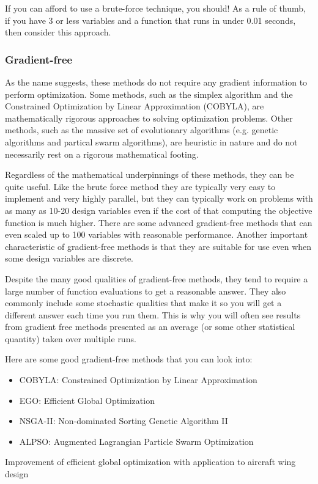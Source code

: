 \documentclass[conf]{new-aiaa}
\begin{document}
            If you can afford to use a brute-force technique, you should! As a rule of thumb, if you have 3 or less variables and a function that runs in under 0.01 seconds, then consider this approach. 

        \subsubsection{Gradient-free}
            As the name suggests, these methods do not require any gradient information to perform optimization.
            Some methods, such as the simplex algorithm and the Constrained Optimization by Linear Approximation (COBYLA), are mathematically rigorous approaches to solving optimization problems. 
            Other methods, such as the massive set of evolutionary algorithms (e.g. genetic algorithms and partical swarm algorithms), are heuristic in nature and do not necessarily rest on a rigorous mathematical footing. 

            Regardless of the mathematical underpinnings of these methods, they can be quite useful. 
            Like the brute force method they are typically very easy to implement and very highly parallel, but they can typically work on problems with as many as 10-20 design variables even if the cost of that computing the objective function is much higher. 
            There are some advanced gradient-free methods that can even scaled up to 100 variables with reasonable performance. 
            Another important characteristic of gradient-free methods is that they are suitable for use even when some design variables are discrete. 

            Despite the many good qualities of gradient-free methods, they tend to require a large number of function evaluations to get a reasonable answer. 
            They also commonly include some stochastic qualities that make it so you will get a different answer each time you run them. 
            This is why you will often see results from gradient free methods presented as an average (or some other statistical quantity) taken over multiple runs. 

            Here are some good gradient-free methods that you can look into: 
            \begin{itemize}
                \item COBYLA: Constrained Optimization by Linear Approximation
                \item EGO: Efficient Global Optimization 
                \item NSGA-II: Non-dominated Sorting Genetic Algorithm II
                \item ALPSO: Augmented Lagrangian Particle Swarm Optimization
            \end{itemize}Improvement of efficient global optimization with application to aircraft wing design
\end{document}
